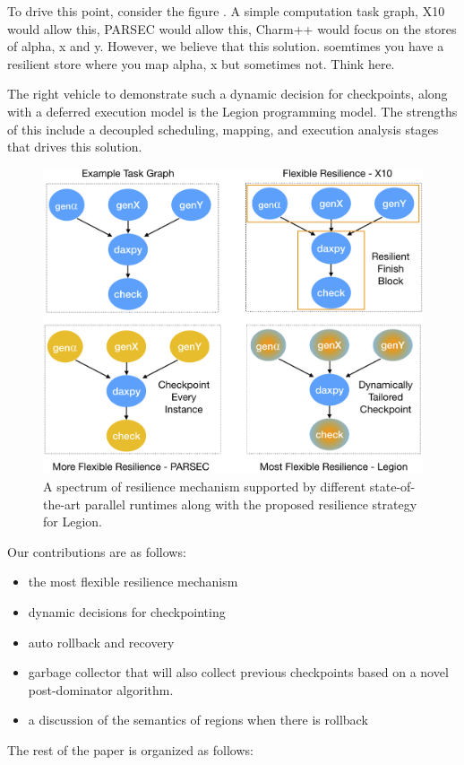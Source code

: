 To drive this point, consider the figure . A simple computation task graph, X10
would allow this, PARSEC would allow this, Charm++ would focus on the stores of
alpha, x and y. However, we believe that this solution.  soemtimes you have a
resilient store where you map alpha, x but sometimes not. Think here.

The right vehicle to demonstrate such a dynamic decision for checkpoints, along
with a deferred execution model is the Legion programming model. The strengths
of this include a decoupled scheduling, mapping, and execution analysis stages
that drives this solution.

\begin{figure}
\centering
\includegraphics[width=.42\textwidth]{images/spectrum_x10_parsec_legion_policies.png}
\caption{A spectrum of resilience mechanism supported by different
state-of-the-art parallel runtimes along with the proposed resilience strategy
for Legion.} 
\end{figure}

Our contributions are as follows: 
\begin{itemize} 
\item the most flexible resilience mechanism 
\item dynamic decisions for checkpointing 
\item auto rollback and recovery 
\item garbage collector that will also collect previous 
checkpoints based on a novel post-dominator algorithm.  
\item a discussion of the semantics of regions when there is rollback 
\end{itemize}

The rest of the paper is organized as follows:

